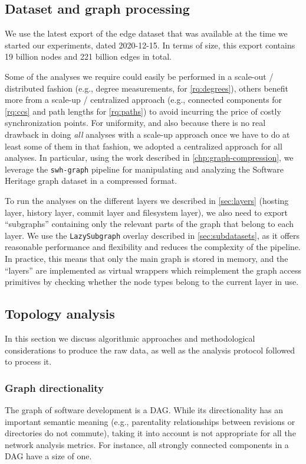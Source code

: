\subsection{Dataset and graph processing}

We use the latest export of the edge dataset that was available at the time we
started our experiments, dated 2020-12-15. In terms of size, this export
contains 19 billion nodes and 221 billion edges in total.

Some of the analyses we require could easily be performed in a
scale-out / distributed fashion (e.g., degree measurements, for
\cref{rq:degrees}), others benefit more from a scale-up / centralized approach
(e.g., connected components for \cref{rq:ccs} and path lengths for
\cref{rq:paths}) to avoid incurring the price of costly synchronization points.
For uniformity, and also because there is no real drawback in doing \emph{all}
analyses with a scale-up approach once we have to do at least some of them in
that fashion, we adopted a centralized approach for all analyses.
In particular, using the work described in \cref{chp:graph-compression}, we
leverage the \texttt{swh-graph} pipeline for manipulating and analyzing the
Software Heritage graph dataset in a compressed format.

To run the analyses on the different layers we described in \cref{sec:layers}
(hosting layer, history layer, commit layer and filesystem layer), we also need
to export ``subgraphs'' containing only the relevant parts of the graph that
belong to each layer. We use the \texttt{LazySubgraph} overlay described in
\cref{sec:subdatasets}, as it offers reasonable performance and flexibility and
reduces the complexity of the pipeline.  In practice, this means that only the
main graph is stored in memory, and the ``layers'' are implemented as virtual
wrappers which reimplement the graph access primitives by checking whether the
node types belong to the current layer in use.

\subsection{Topology analysis}

In this section we discuss algorithmic approaches and methodological
considerations to produce the raw data, as well as the analysis protocol
followed to process it.

\subsubsection{Graph directionality}
The graph of software development is a \gls{DAG}. While its
directionality has an important semantic meaning (e.g., parentality
relationships between revisions or directories do not commute), taking it into
account is not appropriate for all the network analysis metrics.
For instance, all strongly connected components in a DAG have a size of one.

